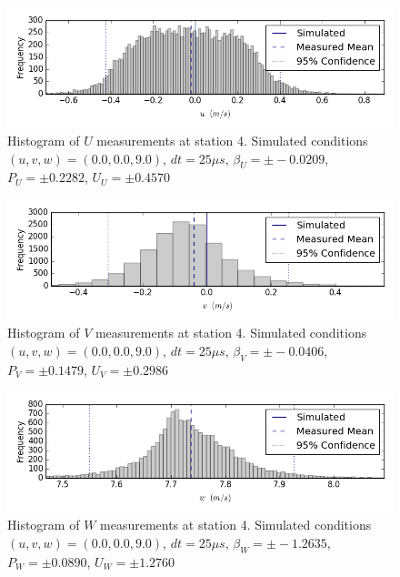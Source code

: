 \begin{figure}[H]
\centering
\includegraphics[width=6in]{figs/Ely_May28th04003/uncertainty_Ely_May28th04003_U}
\caption{Histogram of $U$ measurements at station 4. Simulated conditions $(u,v,w)=(0.0, 0.0, 9.0)$, $dt=25 \mu s$, $\beta_U=\pm -0.0209$, $P_U=\pm 0.2282$, $U_U=\pm 0.4570$}
\label{fig:uncertainty_Ely_May28th04003_U}
\end{figure}


\begin{figure}[H]
\centering
\includegraphics[width=6in]{figs/Ely_May28th04003/uncertainty_Ely_May28th04003_V}
\caption{Histogram of $V$ measurements at station 4. Simulated conditions $(u,v,w)=(0.0, 0.0, 9.0)$, $dt=25 \mu s$, $\beta_V=\pm -0.0406$, $P_V=\pm 0.1479$, $U_V=\pm 0.2986$}
\label{fig:uncertainty_Ely_May28th04003_V}
\end{figure}


\begin{figure}[H]
\centering
\includegraphics[width=6in]{figs/Ely_May28th04003/uncertainty_Ely_May28th04003_W}
\caption{Histogram of $W$ measurements at station 4. Simulated conditions $(u,v,w)=(0.0, 0.0, 9.0)$, $dt=25 \mu s$, $\beta_W=\pm -1.2635$, $P_W=\pm 0.0890$, $U_W=\pm 1.2760$}
\label{fig:uncertainty_Ely_May28th04003_W}
\end{figure}


